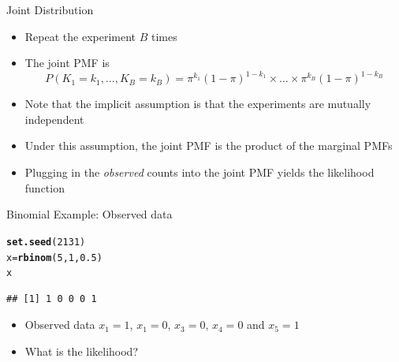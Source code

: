 \documentclass[xcolor=x11names,compress]{beamer}\usepackage[]{graphicx}\usepackage[]{color}
\makeatletter
\newcommand{\hlnum}[1]{\textcolor[rgb]{0.686,0.059,0.569}{#1}}%
\newcommand{\hlstd}[1]{\textcolor[rgb]{0.345,0.345,0.345}{#1}}%
\newcommand{\hlkwb}[1]{\textcolor[rgb]{0.69,0.353,0.396}{#1}}%
\newcommand{\hlkwd}[1]{\textcolor[rgb]{0.737,0.353,0.396}{\textbf{#1}}}%
\newenvironment{kframe}{%
 \def\at@end@of@kframe{}%
 \ifinner\ifhmode%
  \def\at@end@of@kframe{\end{minipage}}%
  \begin{minipage}{\columnwidth}%
 \fi\fi%
 \def\FrameCommand##1{\hskip\@totalleftmargin \hskip-\fboxsep
 \colorbox{shadecolor}{##1}\hskip-\fboxsep
     \hskip-\linewidth \hskip-\@totalleftmargin \hskip\columnwidth}%
 \MakeFramed {\advance\hsize-\width
   \@totalleftmargin\z@ \linewidth\hsize
   \@setminipage}}%
 {\par\unskip\endMakeFramed%
 \at@end@of@kframe}
\newenvironment{knitrout}{}{} %
\makeatother
\begin{document}
\begin{frame}{Joint Distribution}
  \begin{itemize}
  \item Repeat the experiment $B$ times
  \item The joint PMF is
    \begin{equation*}
      P(K_1=k_1,\ldots,K_B=k_B) = \pi^{k_1} (1-\pi)^{1-k_1} \times \ldots \times \pi^{k_B} (1-\pi)^{1-k_B}
    \end{equation*}
  \item Note that the implicit assumption is that the experiments are mutually independent
  \item Under this assumption, the joint PMF is the product of the marginal PMFs
  \item Plugging in the {\it observed} counts into the joint PMF yields the likelihood function
  \end{itemize}
\end{frame}

\begin{frame}[fragile]{Binomial Example: Observed data}
\begin{knitrout}\tiny
{}\color{fgcolor}\begin{kframe}
\begin{alltt}
\hlkwd{set.seed}\hlstd{(}\hlnum{2131}\hlstd{)}
\hlstd{x}\hlkwb{=}\hlkwd{rbinom}\hlstd{(}\hlnum{5}\hlstd{,}\hlnum{1}\hlstd{,}\hlnum{0.5}\hlstd{)}
\hlstd{x}
\end{alltt}
\begin{verbatim}
## [1] 1 0 0 0 1
\end{verbatim}
\end{kframe}
\end{knitrout}
\begin{itemize}
\item Observed data 
  $x_1=1$, $x_1=0$,
  $x_3=0$, $x_4=0$ and
  $x_5=1$
  \item What is the likelihood?
\end{itemize}
\end{frame}
\end{document}
